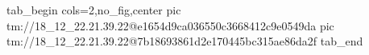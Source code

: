  
 
 
 
 

\qqSecOrig


\ifcmt
  tab_begin cols=2,no_fig,center
    pic tm://18_12_22.21.39.22@e1654d9ca036550c3668412c9e0549da
    pic tm://18_12_22.21.39.22@7b18693861d2e170445bc315ae86da2f
  tab_end
\fi

